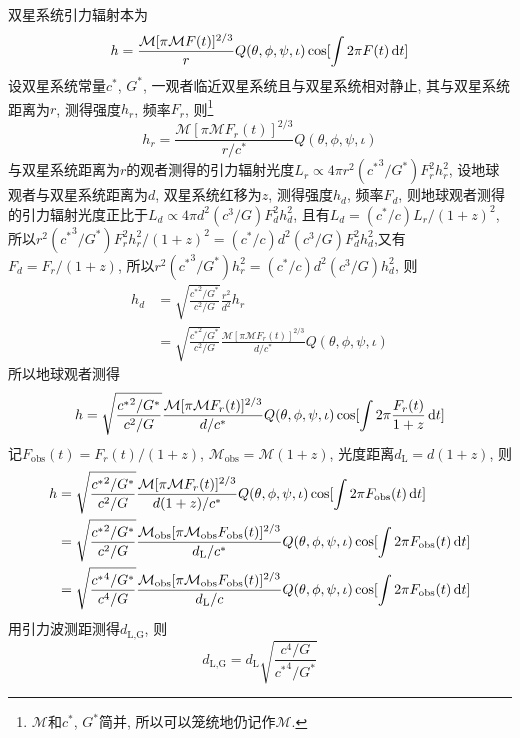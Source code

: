 双星系统引力辐射本为
\begin{equation}
    h=\frac{\mathcal{M}[\pi \mathcal{M}F(t)]^{2/3}}{r}Q(\theta,\phi,\psi,\iota)\cos[\int 2\pi F(t)\,\mathrm{d} t]
\end{equation}
设双星系统常量$c^*$, $G^*$, 一观者临近双星系统且与双星系统相对静止, 其与双星系统距离为$r$, 测得强度$h_r$, 频率$F_r$, 则\footnote{$\mathcal{M}$和$c^*$, $G^*$简并, 所以可以笼统地仍记作$\mathcal{M}$.}
\begin{equation}
    h_r=\frac{\mathcal{M}[\pi \mathcal{M}F_r(t)]^{2/3}}{r/c^*}Q(\theta,\phi,\psi,\iota)
\end{equation}
与双星系统距离为$r$的观者测得的引力辐射光度$L_r\propto4\pi r^2({c^*}^3/G^*)F_r^2 h_r^2$, 设地球观者与双星系统距离为$d$, 双星系统红移为$z$, 测得强度$h_d$, 频率$F_d$, 则地球观者测得的引力辐射光度正比于$L_d\propto4\pi d^2(c^3/G)F_d^2 h_d^2$, 且有$L_d=(c^*/c)L_r/(1+z)^2$, 所以$r^2({c^*}^3/G^*)F_r^2 h_r^2/(1+z)^2=(c^*/c)d^2(c^3/G)F_d^2 h_d^2$,又有$F_d=F_r/(1+z)$, 所以$r^2({c^*}^3/G^*)h_r^2=(c^*/c)d^2(c^3/G)h_d^2$, 则
\begin{align}
    h_d&=\sqrt{\frac{{c^*}^2/G^*}{c^2/G}}\frac{r^2}{d^2}h_r\\
    &=\sqrt{\frac{{c^*}^2/G^*}{c^2/G}}\frac{\mathcal{M}[\pi \mathcal{M}F_r(t)]^{2/3}}{d/c^*}Q(\theta,\phi,\psi,\iota)
\end{align}
所以地球观者测得
\begin{equation}
    h=\sqrt{\frac{{c^*}^2/G^*}{c^2/G}}\frac{\mathcal{M}[\pi \mathcal{M}F_r(t)]^{2/3}}{d/c^*}Q(\theta,\phi,\psi,\iota)\cos[\int 2\pi \frac{F_r(t)}{1+z}\,\mathrm{d} t]
\end{equation}
记$F_\text{obs}(t)=F_r(t)/(1+z)$, $\mathcal{M}_\text{obs}=\mathcal{M}(1+z)$, 光度距离$d_\text{L}=d(1+z)$, 则
\begin{align}
    h&=\sqrt{\frac{{c^*}^2/G^*}{c^2/G}}\frac{\mathcal{M}[\pi \mathcal{M}F_r(t)]^{2/3}}{d(1+z)/c^*}Q(\theta,\phi,\psi,\iota)\cos[\int 2\pi F_\text{obs}(t)\,\mathrm{d} t]\\
    &=\sqrt{\frac{{c^*}^2/G^*}{c^2/G}}\frac{\mathcal{M}_\text{obs}[\pi \mathcal{M}_\text{obs}F_\text{obs}(t)]^{2/3}}{d_\text{L}/c^*}Q(\theta,\phi,\psi,\iota)\cos[\int 2\pi F_\text{obs}(t)\,\mathrm{d} t]\\
    &=\sqrt{\frac{{c^*}^4/G^*}{c^4/G}}\frac{\mathcal{M}_\text{obs}[\pi \mathcal{M}_\text{obs}F_\text{obs}(t)]^{2/3}}{d_\text{L}/c}Q(\theta,\phi,\psi,\iota)\cos[\int 2\pi F_\text{obs}(t)\,\mathrm{d} t]
\end{align}
用引力波测距测得$d_\text{L,G}$, 则
\begin{equation}
    d_\text{L,G}=d_\text{L}\sqrt{\frac{c^4/G}{{c^*}^4/G^*}}
\end{equation}

